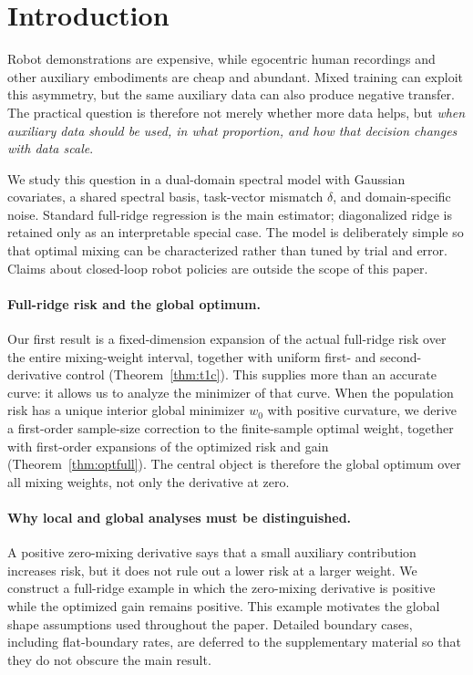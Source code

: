 \section{Introduction}
\label{sec:intro}

Robot demonstrations are expensive, while egocentric human recordings and other auxiliary embodiments are cheap and abundant. Mixed training can exploit this asymmetry, but the same auxiliary data can also produce negative transfer. The practical question is therefore not merely whether more data helps, but \emph{when auxiliary data should be used, in what proportion, and how that decision changes with data scale}.

We study this question in a dual-domain spectral model with Gaussian covariates, a shared spectral basis, task-vector mismatch $\delta$, and domain-specific noise. Standard full-ridge regression is the main estimator; diagonalized ridge is retained only as an interpretable special case. The model is deliberately simple so that optimal mixing can be characterized rather than tuned by trial and error. Claims about closed-loop robot policies are outside the scope of this paper.

\paragraph{Full-ridge risk and the global optimum.}
Our first result is a fixed-dimension expansion of the actual full-ridge risk over the entire mixing-weight interval, together with uniform first- and second-derivative control (Theorem~\ref{thm:t1c}). This supplies more than an accurate curve: it allows us to analyze the minimizer of that curve.
When the population risk has a unique interior global minimizer $w_0$ with positive curvature, we derive a first-order sample-size correction to the finite-sample optimal weight, together with first-order expansions of the optimized risk and gain (Theorem~\ref{thm:optfull}). The central object is therefore the global optimum over all mixing weights, not only the derivative at zero.

\paragraph{Why local and global analyses must be distinguished.}
A positive zero-mixing derivative says that a small auxiliary contribution increases risk, but it does not rule out a lower risk at a larger weight. We construct a full-ridge example in which the zero-mixing derivative is positive while the optimized gain remains positive. This example motivates the global shape assumptions used throughout the paper. Detailed boundary cases, including flat-boundary rates, are deferred to the supplementary material so that they do not obscure the main result.

